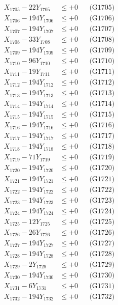 \documentclass[a4paper,10pt]{article}
\begin{document}
{\begin{align}
X_{1705} - 22Y_{1705} &\leq +0 && \text{(G1705)} \\
X_{1706} - 194Y_{1706} &\leq +0 && \text{(G1706)} \\
X_{1707} - 194Y_{1707} &\leq +0 && \text{(G1707)} \\
X_{1708} - 33Y_{1708} &\leq +0 && \text{(G1708)} \\
X_{1709} - 194Y_{1709} &\leq +0 && \text{(G1709)} \\
X_{1710} - 96Y_{1710} &\leq +0 && \text{(G1710)} \\
\allowbreak
X_{1711} - 19Y_{1711} &\leq +0 && \text{(G1711)} \\
X_{1712} - 194Y_{1712} &\leq +0 && \text{(G1712)} \\
X_{1713} - 194Y_{1713} &\leq +0 && \text{(G1713)} \\
X_{1714} - 194Y_{1714} &\leq +0 && \text{(G1714)} \\
X_{1715} - 194Y_{1715} &\leq +0 && \text{(G1715)} \\
X_{1716} - 194Y_{1716} &\leq +0 && \text{(G1716)} \\
X_{1717} - 194Y_{1717} &\leq +0 && \text{(G1717)} \\
X_{1718} - 194Y_{1718} &\leq +0 && \text{(G1718)} \\
X_{1719} - 71Y_{1719} &\leq +0 && \text{(G1719)} \\
X_{1720} - 194Y_{1720} &\leq +0 && \text{(G1720)} \\
\allowbreak
X_{1721} - 194Y_{1721} &\leq +0 && \text{(G1721)} \\
X_{1722} - 194Y_{1722} &\leq +0 && \text{(G1722)} \\
X_{1723} - 194Y_{1723} &\leq +0 && \text{(G1723)} \\
X_{1724} - 194Y_{1724} &\leq +0 && \text{(G1724)} \\
X_{1725} - 12Y_{1725} &\leq +0 && \text{(G1725)} \\
X_{1726} - 26Y_{1726} &\leq +0 && \text{(G1726)} \\
X_{1727} - 194Y_{1727} &\leq +0 && \text{(G1727)} \\
X_{1728} - 194Y_{1728} &\leq +0 && \text{(G1728)} \\
X_{1729} - 2Y_{1729} &\leq +0 && \text{(G1729)} \\
X_{1730} - 194Y_{1730} &\leq +0 && \text{(G1730)} \\
\allowbreak
X_{1731} - 6Y_{1731} &\leq +0 && \text{(G1731)} \\
X_{1732} - 194Y_{1732} &\leq +0 && \text{(G1732)} \\

\end{align}}
\end{document}
